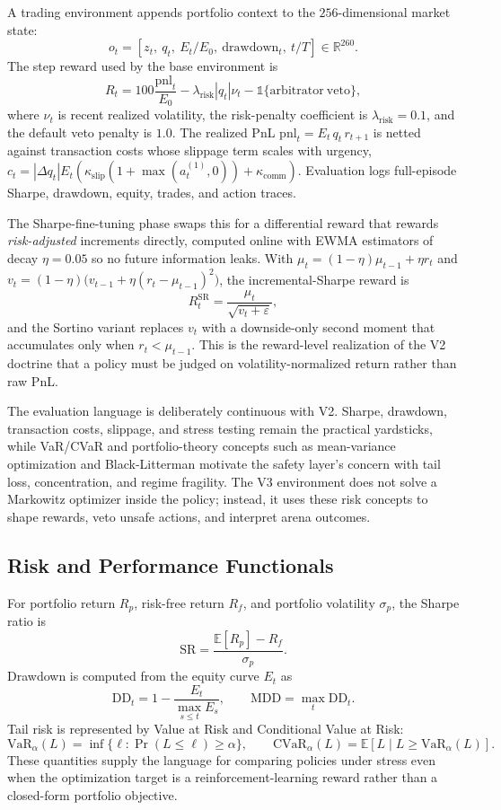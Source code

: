 \documentclass[10pt]{article}
\newcommand{\R}{\mathbb{R}}
\newcommand{\E}{\mathbb{E}}
\newcommand{\ind}{\mathbb{1}}
\begin{document}
A trading environment appends portfolio context to the \(256\)-dimensional market state:
\[
	o_t=[z_t,\ q_t,\ E_t/E_0,\ \mathrm{drawdown}_t,\ t/T]\in\R^{260}.
\]
The step reward used by the base environment is
\[
	R_t
	=
	100\frac{\mathrm{pnl}_t}{E_0}
	-
	\lambda_{\mathrm{risk}}|q_t|\nu_t
	-
	\ind\{\mathrm{arbitrator\ veto}\},
\]
where \(\nu_t\) is recent realized volatility, the risk-penalty coefficient is
\(\lambda_{\mathrm{risk}}=0.1\), and the default veto penalty is \(1.0\). The realized PnL
\(\mathrm{pnl}_t=E_t\,q_t\,r_{t+1}\) is netted against transaction costs whose slippage term
scales with urgency, \(c_t=|\Delta q_t|E_t(\kappa_{\mathrm{slip}}(1+\max(a_t^{(1)},0))+\kappa_{\mathrm{comm}})\).
Evaluation logs full-episode Sharpe, drawdown, equity, trades, and action traces.

The Sharpe-fine-tuning phase swaps this for a differential reward that rewards
\emph{risk-adjusted} increments directly, computed online with EWMA estimators of decay
\(\eta=0.05\) so no future information leaks. With
\(\mu_t=(1-\eta)\mu_{t-1}+\eta r_t\) and
\(v_t=(1-\eta)\bigl(v_{t-1}+\eta(r_t-\mu_{t-1})^2\bigr)\), the incremental-Sharpe reward is
\[
	R_t^{\mathrm{SR}}=\frac{\mu_t}{\sqrt{v_t+\varepsilon}},
\]
and the Sortino variant replaces \(v_t\) with a downside-only second moment that accumulates
only when \(r_t<\mu_{t-1}\). This is the reward-level realization of the V2 doctrine that a
policy must be judged on volatility-normalized return rather than raw PnL.

The evaluation language is deliberately continuous with V2. Sharpe, drawdown, transaction
costs, slippage, and stress testing remain the practical yardsticks, while VaR/CVaR and
portfolio-theory concepts such as mean-variance optimization and Black-Litterman
\cite{blacklitterman1992} motivate the safety layer's concern with tail loss, concentration,
and regime fragility. The V3 environment does not solve a Markowitz optimizer inside the
policy; instead, it uses these risk concepts to shape rewards, veto unsafe actions, and
interpret arena outcomes.

\subsection{Risk and Performance Functionals}

For portfolio return \(R_p\), risk-free return \(R_f\), and portfolio volatility
\(\sigma_p\), the Sharpe ratio is
\[
	\mathrm{SR}=\frac{\E[R_p]-R_f}{\sigma_p}.
\]
Drawdown is computed from the equity curve \(E_t\) as
\[
	\mathrm{DD}_t = 1-\frac{E_t}{\max_{s\le t}E_s},
	\qquad
	\mathrm{MDD}=\max_t \mathrm{DD}_t.
\]
Tail risk is represented by Value at Risk and Conditional Value at Risk:
\[
	\mathrm{VaR}_{\alpha}(L)=\inf\{\ell:\Pr(L\le \ell)\ge \alpha\},
	\qquad
	\mathrm{CVaR}_{\alpha}(L)=\E[L\mid L\ge \mathrm{VaR}_{\alpha}(L)].
\]
These quantities supply the language for comparing policies under stress even when the
optimization target is a reinforcement-learning reward rather than a closed-form portfolio
objective.
\end{document}
